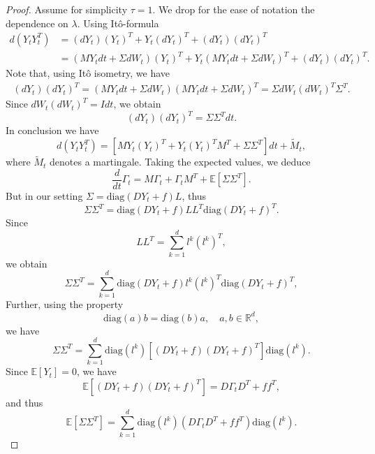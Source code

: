 \documentclass[10pt,a4paper]{amsart}
\begin{document}
\begin{proof}
    Assume for simplicity $\tau = 1$. We drop for the ease of notation the dependence on $\lambda$. Using It\^{o}-formula
    \begin{equation*}
        \begin{split}
            d (Y_t Y_t^T) &= (dY_t)(Y_t)^T + Y_t(dY_t)^T + (dY_t)(dY_t)^T  \\
            & = (MY_t dt + \Sigma  dW_t) (Y_t)^T + Y_t( MY_tdt+ \Sigma  dW_t)^T + (dY_t)(dY_t)^T.
        \end{split}
    \end{equation*}
    Note that, using It\^{o} isometry, we have
    \begin{equation*}
        \begin{split}
            (dY_t)(dY_t)^T =(MY_tdt+ \Sigma  dW_t) (MY_tdt+ \Sigma  dW_t)^T = \Sigma  dW_t (dW_t)^T \Sigma^T.
        \end{split}
    \end{equation*}
    Since $dW_t (dW_t)^T = I dt$, we obtain
    $$
    (dY_t)(dY_t)^T = \Sigma \Sigma^T dt.
    $$
    In conclusion we have
    $$
    d(Y_t Y_t^T) = [M Y_t(Y_t)^T  + Y_t (Y_t)^T M^T + \Sigma \Sigma^T]dt + \widetilde M_t,
    $$
    where $\widetilde M_t$ denotes a martingale. Taking the expected values, we deduce
    $$
    \frac{d}{dt} \Gamma_t = M  \Gamma_t + \Gamma_t  M^T + \mathbb{E}[\Sigma \Sigma^T].
    $$
    But in our setting $\Sigma = \mathrm{diag} (DY_t +f)L$, thus
    $$
    \Sigma \Sigma^T = \mathrm{diag} (DY_t +f) L L^T \mathrm{diag}( DY_t +f)^T.
    $$
    Since
    $$
    L L^T = \sum_{k =1 }^d l^k (l^k)^T,
    $$
    we obtain
    $$
    \Sigma \Sigma^T = \sum_{k = 1}^d \mathrm{diag} ( DY_t + f) l^k (l^k)^T \mathrm{diag} (DY_t +f)^T,
    $$
    Further, using the property
    $$
    \mathrm{diag} (a) b = \mathrm{diag}(b)a, \quad a,b \in \mathbb{R}^d,
    $$
    we have
    $$
    \Sigma \Sigma^T = \sum_{k =1 }^d \mathrm{diag} (l^k ) \left[(DY_t +f) (DY_t +f)^T \right] \mathrm{diag}(l^k).
    $$
    Since $\mathbb{E}[Y_t] = 0$, we have
    $$
    \mathbb{E}\left[(DY_t +f) (DY_t+f)^T \right] = D \Gamma_t  D^T + f f^T,
    $$
    and thus
    $$
    \mathbb{E}\left[\Sigma \Sigma^T \right] = \sum_{k = 1}^d \mathrm{diag}(l^k) (D \Gamma_t  D^T + f f^T) \mathrm{diag} (l^k).
    $$
\end{proof}
\end{document}
